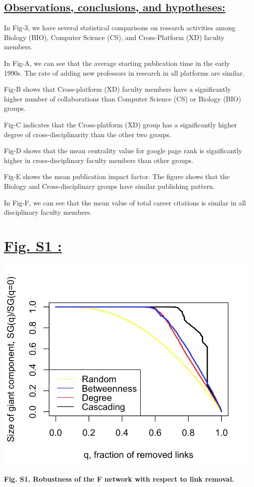 \documentclass{article}\usepackage[]{graphicx}\usepackage[]{color}
\begin{document}
\subsection*{\underline{Observations, conclusions, and hypotheses:}}
\begin{description}
  \item In Fig-3, we have several statistical comparisons on research activities among Biology (BIO), Computer Science (CS), and Cross-Platform (XD) faculty members. 
  \item[$\bullet$] In Fig-A, we can see that the average starting publication time in the early 1990s. The rate of adding new professors in research in all platforms are similar. 
  \item[$\bullet$]Fig-B shows that Cross-platform (XD) faculty members have a significantly higher number of collaborations than Computer Science (CS) or Biology (BIO) groups. 
  \item[$\bullet$]Fig-C indicates that the Cross-platform (XD) group has a significantly higher degree of cross-disciplinarity than the other two groups.
  \item[$\bullet$]Fig-D shows that the mean centrality value for google page rank is significantly higher in cross-disciplinary faculty members than other groups. 
  \item[$\bullet$]Fig-E shows the mean publication impact factor. The figure shows that the Biology and Cross-disciplinary groups have similar publishing pattern.
  \item[$\bullet$]In Fig-F, we can see that the mean value of total career citations is similar in all disciplinary faculty members.
\end{description}


\newpage
\section*{\underline{Fig. S1 :}}
\begin{center}
\includegraphics[scale=0.9]{S1.png}
\newline
\par{\textbf{Fig. S1. Robustness of the F network with respect to link removal.}}
\end{center}
\end{document}
